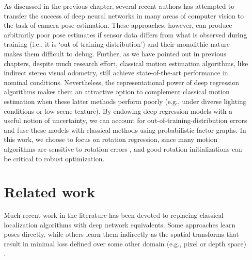  
As discussed in the previous chapter, several recent authors  \citep{Clark2017, Melekhov2017-dl, Kendall2015-ew} has attempted to  transfer the success of deep neural networks in many areas of computer vision to the task of camera pose estimation. These approaches, however, can produce arbitrarily poor pose estimates if sensor data differs from what is observed during training (i.e., it is `out of training distribution') and their monolithic nature makes them difficult to debug. Further, as we have pointed out in previous chapters, despite much research effort, classical motion estimation algorithms, like indirect stereo visual odometry, still achieve state-of-the-art performance in nominal conditions. Nevertheless, the representational power of deep regression algorithms makes them an attractive option to complement classical motion estimation when these latter methods perform poorly (e.g., under diverse lighting conditions or low scene texture). By endowing deep regression models with a useful notion of uncertainty, we can account for out-of-training-distribution errors and fuse these models with classical methods using probabilistic factor graphs. In this work, we choose to focus on rotation regression, since many motion algorithms are sensitive to rotation errors \citep{2018_Peretroukhin_Inferring,Olson2003-ax}, and good rotation initializations can be critical to robust optimization. 








\section{Related work}

%


Much recent work in the literature has been devoted to replacing classical localization algorithms with deep network equivalents. Some approaches \citep{Clark2017, Kendall2015-ew, Kendall2017-ud, Melekhov2017-dl} learn poses  directly, while others learn them indirectly as the spatial transforms that result in minimal loss defined over some other domain (e.g., pixel or depth space) \citep{Byravan2017-ik, Handa2016-hm}.

